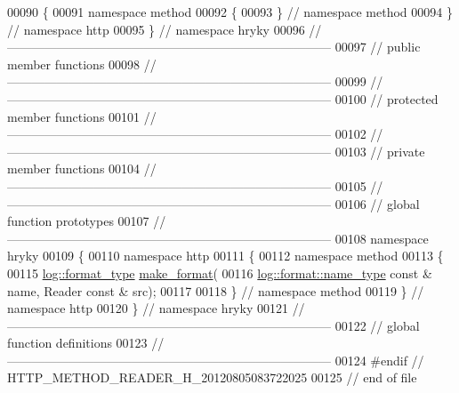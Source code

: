 \begin{DoxyCode}
00090 \{
00091 \textcolor{keyword}{namespace }method
00092 \{
00093 \} \textcolor{comment}{// namespace method}
00094 \} \textcolor{comment}{// namespace http}
00095 \} \textcolor{comment}{// namespace hryky}
00096 \textcolor{comment}{//
      ------------------------------------------------------------------------------}
00097 \textcolor{comment}{// public member functions}
00098 \textcolor{comment}{//
      ------------------------------------------------------------------------------}
00099 \textcolor{comment}{//
      ------------------------------------------------------------------------------}
00100 \textcolor{comment}{// protected member functions}
00101 \textcolor{comment}{//
      ------------------------------------------------------------------------------}
00102 \textcolor{comment}{//
      ------------------------------------------------------------------------------}
00103 \textcolor{comment}{// private member functions}
00104 \textcolor{comment}{//
      ------------------------------------------------------------------------------}
00105 \textcolor{comment}{//
      ------------------------------------------------------------------------------}
00106 \textcolor{comment}{// global function prototypes}
00107 \textcolor{comment}{//
      ------------------------------------------------------------------------------}
00108 \textcolor{keyword}{namespace }hryky
00109 \{
00110 \textcolor{keyword}{namespace }http
00111 \{
00112 \textcolor{keyword}{namespace }method
00113 \{
00115     \hyperlink{namespacehryky_1_1log_ad50448c3f934f1eacd5c1bcffe8111e1}{log::format_type} \hyperlink{namespacehryky_afd615217f648ff164bc40fb82166d959}{make_format}(
00116         \hyperlink{namespacehryky_1_1log_1_1format_ab7408d1e2ed2d648dbf9bba69eb74288}{log::format::name_type} \textcolor{keyword}{const} & name, Reader \textcolor{keyword}{const} & src);
00117 
00118 \} \textcolor{comment}{// namespace method}
00119 \} \textcolor{comment}{// namespace http}
00120 \} \textcolor{comment}{// namespace hryky}
00121 \textcolor{comment}{//
      ------------------------------------------------------------------------------}
00122 \textcolor{comment}{// global function definitions}
00123 \textcolor{comment}{//
      ------------------------------------------------------------------------------}
00124 \textcolor{preprocessor}{#endif // HTTP\_METHOD\_READER\_H\_20120805083722025}
00125 \textcolor{preprocessor}{}\textcolor{comment}{// end of file}
\end{DoxyCode}
